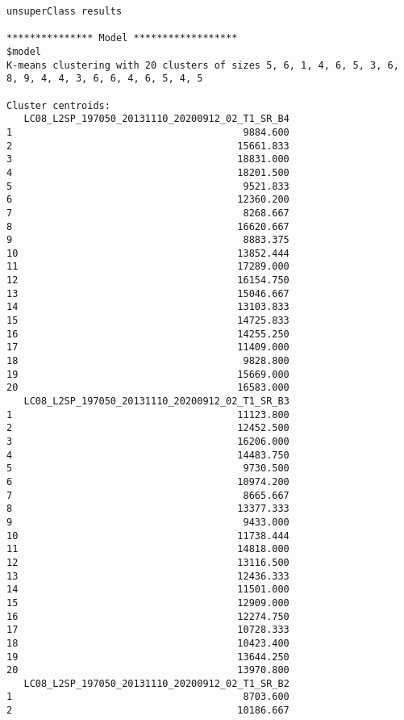 \begin{scriptsize}
\begin{verbatim}
unsuperClass results

*************** Model ******************
$model
K-means clustering with 20 clusters of sizes 5, 6, 1, 4, 6, 5, 3, 6, 8, 9, 4, 4, 3, 6, 6, 4, 6, 5, 4, 5

Cluster centroids:
   LC08_L2SP_197050_20131110_20200912_02_T1_SR_B4
1                                        9884.600
2                                       15661.833
3                                       18831.000
4                                       18201.500
5                                        9521.833
6                                       12360.200
7                                        8268.667
8                                       16620.667
9                                        8883.375
10                                      13852.444
11                                      17289.000
12                                      16154.750
13                                      15046.667
14                                      13103.833
15                                      14725.833
16                                      14255.250
17                                      11409.000
18                                       9828.800
19                                      15669.000
20                                      16583.000
   LC08_L2SP_197050_20131110_20200912_02_T1_SR_B3
1                                       11123.800
2                                       12452.500
3                                       16206.000
4                                       14483.750
5                                        9730.500
6                                       10974.200
7                                        8665.667
8                                       13377.333
9                                        9433.000
10                                      11738.444
11                                      14818.000
12                                      13116.500
13                                      12436.333
14                                      11501.000
15                                      12909.000
16                                      12274.750
17                                      10728.333
18                                      10423.400
19                                      13644.250
20                                      13970.800
   LC08_L2SP_197050_20131110_20200912_02_T1_SR_B2
1                                        8703.600
2                                       10186.667

\end{verbatim}
\end{scriptsize}
